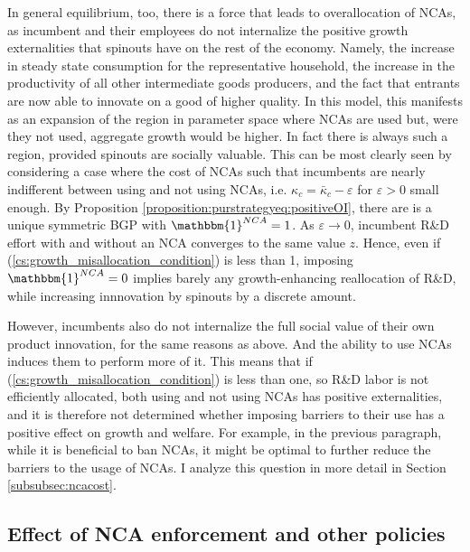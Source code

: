 \documentclass[11pt,english]{article}
\theoremstyle{definition}
\begin{document}
In general equilibrium, too, there is a force that leads to overallocation of NCAs, as incumbent and their employees do not internalize the positive growth externalities that spinouts have on the rest of the economy. Namely, the increase in steady state consumption for the representative household, the increase in the productivity of all other intermediate goods producers, and the fact that entrants are now able to innovate on a good of higher quality. In this model, this manifests as an expansion of the region in parameter space where NCAs are used but, were they not used, aggregate growth would be higher. In fact there is always such a region, provided spinouts are socially valuable. This can be most clearly seen by considering a case where the cost of NCAs such that incumbents are nearly indifferent between using and not using NCAs, i.e. $\kappa_c = \bar{\kappa}_c - \varepsilon$ for $\varepsilon > 0$ small enough. By Proposition \ref{proposition:purstrategyeq:positiveOI}, there are is a unique symmetric BGP with $\mathbbm{1}^{NCA} = 1$. As $\varepsilon \to 0$, incumbent R\&D effort with and without an NCA converges to the same value $z$. Hence, even if (\ref{cs:growth_misallocation_condition}) is less than 1, imposing $\mathbbm{1}^{NCA} = 0$ implies barely any growth-enhancing reallocation of R\&D, while increasing innnovation by spinouts by a discrete amount. 

However, incumbents also do not internalize the full social value of their own product innovation, for the same reasons as above. And the ability to use NCAs induces them to perform more of it. This means that if (\ref{cs:growth_misallocation_condition}) is less than one, so R\&D labor is not efficiently allocated, both using and not using NCAs has positive externalities, and it is therefore not determined whether imposing barriers to their use has a positive effect on growth and welfare. For example, in the previous paragraph, while it is beneficial to ban NCAs, it might be optimal to further reduce the barriers to the usage of NCAs. I analyze this question in more detail in Section \ref{subsubsec:ncacost}. 

\subsection{Effect of NCA enforcement and other policies}\label{model:efficiency:policy_analysis}
\end{document}
